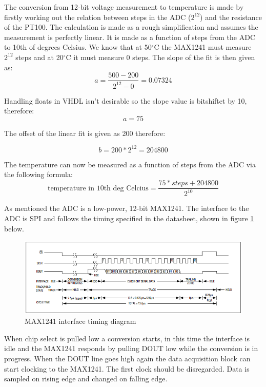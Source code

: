 The conversion from 12-bit voltage measurement to temperature is made by firstly working out the relation between steps in the ADC ($2^{12}$) and the resistance of the PT100. The calculation is made as a rough simplification and assumes the measurement is perfectly linear. It is made as a function of steps from the ADC to 10th of degrees Celsius. We know that at 50$^\circ$C the MAX1241 must measure $2^{12}$ steps and at 20$^\circ$C it must measure 0 steps. The slope of the fit is then given as:
\begin{equation}
	a=\frac{500-200}{2^{12}-0}=0.07324
\end{equation}

Handling floats in VHDL isn't desirable so the slope value is bitshiftet by 10, therefore:
\begin{equation}
	a=75
\end{equation}

The offset of the linear fit is given as 200 therefore:

\begin{equation}
	b=200*2^{12}=204800
\end{equation}

The temperature can now be measured as a function of steps from the ADC via the following formula:
\begin{equation}
	\text{temperature in 10th deg Celcius} = \frac{75*steps+204800}{2^{10}}
\end{equation}

As mentioned the ADC is a low-power, 12-bit MAX1241. The interface to the ADC is SPI and follows the timing specified in the datasheet, shown in figure \ref{fig:max1241_timing} below.


\begin{figure}[H]
	\centering
	\includegraphics[width=1\textwidth]{billeder/max1241_interface_timing}
	\caption{MAX1241 interface timing diagram}
	\label{fig:max1241_timing}
\end{figure}

When chip select is pulled low a conversion starts, in this time the interface is idle and the MAX1241 responds by pulling DOUT low while the conversion is in progress. When the DOUT line goes high again the data acquisition block can start clocking to the MAX1241. The first clock should be disregarded. Data is sampled on rising edge and changed on falling edge.

